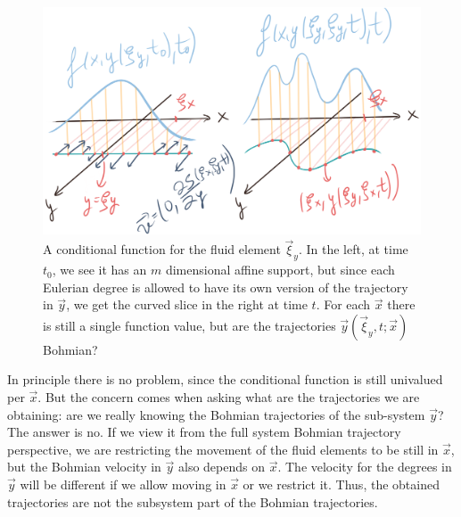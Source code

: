 \documentclass[11pt, a4paper]{article} %
\DeclareRobustCommand{\mybox}[2][gray!10]{%
\begin{tcolorbox}[   %
        left=0.2cm,
        right=0.2cm,
        top=0.15cm,
        bottom=0.15cm,
        colback=#1,
        colframe=#1,
        width=\dimexpr\textwidth\relax, 
        enlarge left by=0mm,
        boxsep=5pt,
        arc=0pt,outer arc=0pt,
        ]
        #2
\end{tcolorbox}
}
\begin{document}
\begin{figure}[h!]
  \centering
    \includegraphics[width=0.65\linewidth]{unstructure_aligned.png}
  \caption{A conditional function for the fluid element $\vec{\xi}_y$. In the left, at time $t_0$, we see it has an $m$ dimensional affine support, but since each Eulerian degree is allowed to have its own version of the trajectory in $\vec{y}$, we get the curved slice in the right at time $t$. For each $\vec{x}$ there is still a single function value, but are the trajectories $\vec{y}(\vec{\xi}_y,t;\vec{x})$ Bohmian? %
  }
  \label{fig:only_y}
\end{figure}
\mybox{
In principle there is no problem, since the conditional function is still univalued per $\vec{x}$. But the concern comes when asking what are the trajectories we are obtaining: are we really knowing the Bohmian trajectories of the sub-system $\vec{y}$? The answer is no. If we view it from the full system Bohmian trajectory perspective, we are restricting the movement of the fluid elements to be still in $\vec{x}$, but the Bohmian velocity in $\vec{y}$ also depends on $\vec{x}$. The velocity for the degrees in $\vec{y}$ will be different if we allow moving in $\vec{x}$ or we restrict it. Thus, the obtained trajectories are not the subsystem part of the Bohmian trajectories.}%
\end{document}
